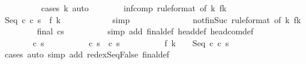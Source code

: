 \begin{isabellebody}
\ \ \ \ \ \ \ \ \isamarkupfalse%
\ {\isacharparenleft}cases\ k{\isacharparenright}\ auto\isanewline
\ \ \ \ \ \ \isamarkupfalse%
\ inf{\isacharunderscore}comp\ {\isacharbrackleft}rule{\isacharunderscore}format{\isacharcomma}\ of\ k{\isacharbrackright}\ f{\isacharunderscore}k\isanewline
\ \ \ \ \ \ \isamarkupfalse%
\ {\isachardoublequoteopen}{\isasymGamma}{\isasymturnstile}{\isacharparenleft}Seq\ c{\isacharprime}\ c\ s{\isacharprime}{\isacharparenright}\ {\isasymrightarrow}\ f\ {\isacharparenleft}k\ {\isacharplus}\ {}{\isacharparenright}{\isachardoublequoteclose}\isanewline
\ \ \ \ \ \ \ \ \isamarkupfalse%
\ simp\isanewline
\ \ \ \ \ \ \isamarkupfalse%
\isanewline
\ \ \ \ \ \ \isamarkupfalse%
\ not{\isacharunderscore}fin{\isacharunderscore}Suc\ {\isacharbrackleft}rule{\isacharunderscore}format{\isacharcomma}\ of\ k{\isacharbrackright}\ f{\isacharunderscore}k\isanewline
\ \ \ \ \ \ \isamarkupfalse%
\ {\isachardoublequoteopen}{\isasymnot}\ final\ {\isacharparenleft}c{\isacharprime}{\isacharcomma}s{\isacharprime}{\isacharparenright}{\isachardoublequoteclose}\isanewline
\ \ \ \ \ \ \ \ \isamarkupfalse%
\ {\isacharparenleft}simp\ add{\isacharcolon}\ final{\isacharunderscore}def\ head{\isacharunderscore}def\ head{\isacharunderscore}com{\isacharunderscore}def{\isacharparenright}\isanewline
\ \ \ \ \ \ \isamarkupfalse%
\isanewline
\ \ \ \ \ \ \isamarkupfalse%
\ c{\isacharprime}{\isacharprime}\ s{\isacharprime}{\isacharprime}\ \isanewline
\ \ \ \ \ \ \ \ \ {\isachardoublequoteopen}{\isasymGamma}{\isasymturnstile}{\isacharparenleft}c{\isacharprime}{\isacharcomma}\ s{\isacharprime}{\isacharparenright}\ {\isasymrightarrow}\ {\isacharparenleft}c{\isacharprime}{\isacharprime}{\isacharcomma}\ s{\isacharprime}{\isacharprime}{\isacharparenright}{\isachardoublequoteclose}\ \isanewline
\ \ \ \ \ \ \ \ \ {\isachardoublequoteopen}f\ {\isacharparenleft}k\ {\isacharplus}\ {}{\isacharparenright}\ {\isacharequal}\ {\isacharparenleft}Seq\ c{\isacharprime}{\isacharprime}\ c\ s{\isacharprime}{\isacharprime}{\isacharparenright}{\isachardoublequoteclose}\isanewline
\ \ \ \ \ \ \ \ \isamarkupfalse%
\ cases\ {\isacharparenleft}auto\ simp\ add{\isacharcolon}\ redex{\isacharunderscore}Seq{\isacharunderscore}False\ final{\isacharunderscore}def{\isacharparenright}\isanewline

\end{isabellebody}

